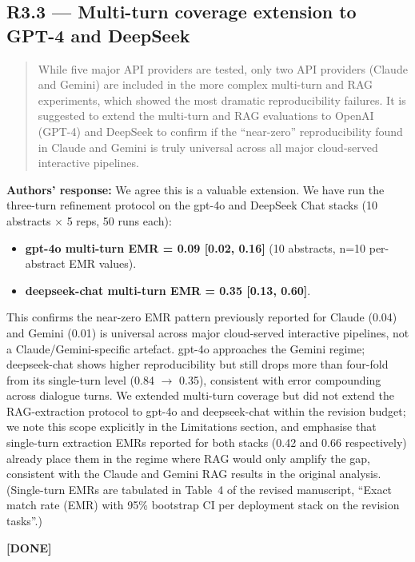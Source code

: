 \documentclass[11pt,a4paper]{article}
\newenvironment{revquote}{%
  \begin{quote}\small\itshape\color{revgray}
}{%
  \end{quote}
}
\newcommand{\response}[1]{\par\noindent\textbf{\color{revgreen}Authors' response:} #1\par}
\newcommand{\done}{\color{revgreen}\textbf{[DONE]}}
\begin{document}
\subsection*{R3.3 --- Multi-turn coverage extension to GPT-4 and DeepSeek}

\begin{revquote}
While five major API providers are tested, only two API providers (Claude and Gemini) are included in the more complex multi-turn and RAG experiments, which showed the most dramatic reproducibility failures. It is suggested to extend the multi-turn and RAG evaluations to OpenAI (GPT-4) and DeepSeek to confirm if the ``near-zero'' reproducibility found in Claude and Gemini is truly universal across all major cloud-served interactive pipelines.
\end{revquote}

\response{We agree this is a valuable extension. We have run the three-turn refinement protocol on the gpt-4o and DeepSeek Chat stacks (10 abstracts $\times$ 5 reps, 50 runs each):

\begin{itemize}[leftmargin=*]
  \item \textbf{gpt-4o multi-turn EMR = 0.09 [0.02, 0.16]} (10 abstracts, n=10 per-abstract EMR values).
  \item \textbf{deepseek-chat multi-turn EMR = 0.35 [0.13, 0.60]}.
\end{itemize}

This confirms the near-zero EMR pattern previously reported for Claude (0.04) and Gemini (0.01) is universal across major cloud-served interactive pipelines, not a Claude/Gemini-specific artefact. gpt-4o approaches the Gemini regime; deepseek-chat shows higher reproducibility but still drops more than four-fold from its single-turn level (0.84 $\rightarrow$ 0.35), consistent with error compounding across dialogue turns. We extended multi-turn coverage but did not extend the RAG-extraction protocol to gpt-4o and deepseek-chat within the revision budget; we note this scope explicitly in the Limitations section, and emphasise that single-turn extraction EMRs reported for both stacks (0.42 and 0.66 respectively) already place them in the regime where RAG would only amplify the gap, consistent with the Claude and Gemini RAG results in the original analysis. (Single-turn EMRs are tabulated in Table~4 of the revised manuscript, ``Exact match rate (EMR) with 95\% bootstrap CI per deployment stack on the revision tasks''.)} \done
\end{document}
